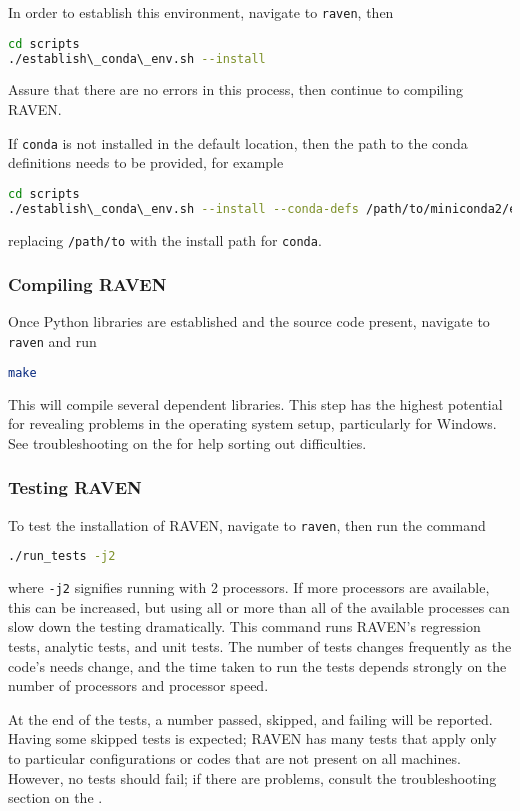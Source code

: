 In order to establish this environment, navigate to \texttt{raven}, then
\begin{lstlisting}[language=bash]
cd scripts
./establish\_conda\_env.sh --install
\end{lstlisting}
Assure that there are no errors in this process, then continue to compiling RAVEN.

\nb If \texttt{conda} is not installed in the default location, then the path to the conda definitions
needs to be provided, for example
\begin{lstlisting}[language=bash]
cd scripts
./establish\_conda\_env.sh --install --conda-defs /path/to/miniconda2/etc/profile.d/conda.sh
\end{lstlisting}
replacing \texttt{/path/to} with the install path for \texttt{conda}.




\subsubsection{Compiling RAVEN}
Once Python libraries are established and the source code present, navigate to \texttt{raven} and run
\begin{lstlisting}[language=bash]
make
\end{lstlisting}
This will compile several dependent libraries.  This step has the highest potential for revealing problems in
the operating system setup, particularly for Windows.  See troubleshooting on the \wiki for help sorting out
difficulties.




\subsubsection{Testing RAVEN}
\label{sec:testing raven}
To test the installation of RAVEN, navigate to \texttt{raven}, then run the command
\begin{lstlisting}[language=bash]
./run_tests -j2
\end{lstlisting}
where \texttt{-j2} signifies running with 2 processors.  If more processors are available, this can be
increased, but using all or more than all of the available processes can slow down the testing dramatically.
This command runs RAVEN's regression tests, analytic tests, and unit tests.  The number of tests changes
frequently as the code's needs change, and the time taken to run the tests depends strongly on the number of
processors and processor speed.

At the end of the tests, a number passed, skipped, and failing will be reported.  Having some skipped tests is
expected; RAVEN has many tests that apply only to particular configurations or codes that are not present on
all machines.  However, no tests should fail; if there are problems, consult the troubleshooting section on
the \wiki.


